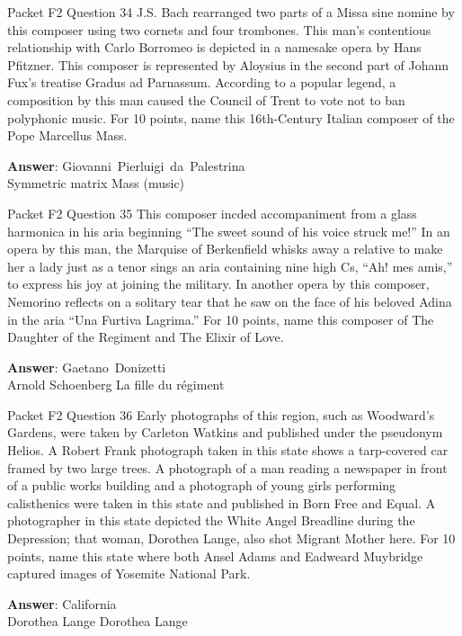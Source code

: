\begin{frame}{Packet F2 Question 34}
J.S.   Bach rearranged two parts of a Missa sine nomine by this   composer using two cornets and four trombones. This man’s contentious relationship with Carlo Borromeo is depicted in a namesake opera by Hans Pfitzner. This composer   is represented   by Aloysius in the second part of Johann Fux’s treatise Gradus   ad Parnassum. According to a popular legend, a composition by this man caused the Council of Trent   to vote not to ban polyphonic music. For 10 points, name this 16th-Century Italian composer of the Pope Marcellus Mass.

\textbf{Answer}: Giovanni\ Pierluigi\ da\ Palestrina\\
 Symmetric matrix
 Mass (music)
\end{frame}

\begin{frame}{Packet F2 Question 35}
This composer incded accompaniment from a   glass harmonica in his aria beginning “The sweet sound of his voice struck me!” In an opera by this man, the Marquise of Berkenfield whisks   away a relative to make her a lady just as a tenor sings an aria containing nine high Cs, “Ah! mes amis,” to express his   joy at joining the military. In another opera by this composer, Nemorino reflects     on a solitary tear that he saw on the face of his beloved Adina in the aria “Una   Furtiva Lagrima.” For 10 points, name this composer of The Daughter of the Regiment and The Elixir of Love.

\textbf{Answer}: Gaetano\ Donizetti\\
 Arnold Schoenberg
 La fille du régiment
\end{frame}

\begin{frame}{Packet F2 Question 36}
Early photographs of this region, such as Woodward's Gardens, were taken by Carleton Watkins and published under the pseudonym Helios. A Robert Frank photograph taken in this state shows   a tarp-covered car framed by two large trees. A photograph of a man reading a newspaper in front of a public works building and a photograph of young girls performing calisthenics were taken in this state and published in Born Free and Equal. A photographer   in this state depicted the White Angel Breadline during the Depression; that   woman, Dorothea Lange, also shot Migrant Mother here. For 10 points, name this state where both Ansel Adams and Eadweard Muybridge captured images of Yosemite National   Park.  

\textbf{Answer}: California\\
 Dorothea Lange
 Dorothea Lange
\end{frame}

